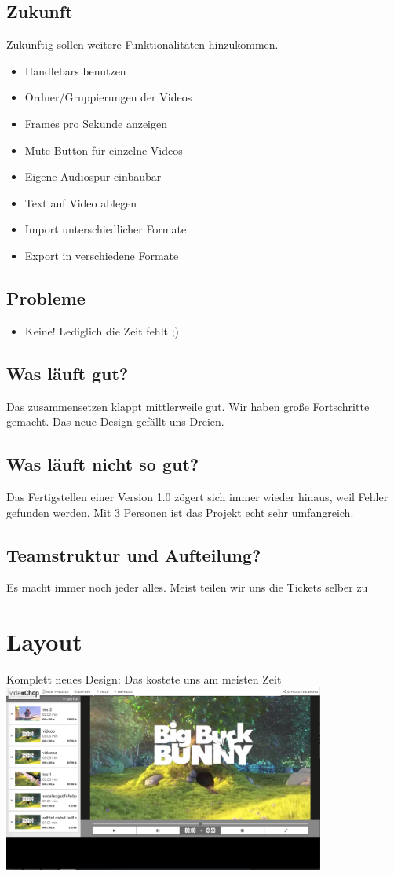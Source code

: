 \documentclass[a4paper,10pt]{scrartcl}
\begin{document}
\subsection{Zukunft}
Zukünftig sollen weitere Funktionalitäten hinzukommen. 
\begin{itemize}
    \item Handlebars benutzen
    \item Ordner/Gruppierungen der Videos
    \item Frames pro Sekunde anzeigen
    \item Mute-Button für einzelne Videos
    \item Eigene Audiospur einbaubar
    \item Text auf Video ablegen
    \item Import unterschiedlicher Formate
	\item Export in verschiedene Formate
	\end{itemize}
\subsection{Probleme}
\begin{itemize}
	\item Keine! Lediglich die Zeit fehlt ;)
	\end{itemize}
\subsection{Was läuft gut?}
Das zusammensetzen klappt mittlerweile gut. Wir haben große Fortschritte gemacht. Das neue Design gefällt uns Dreien.
\subsection{Was läuft nicht so gut?}
Das Fertigstellen einer Version 1.0 zögert sich immer wieder hinaus, weil Fehler gefunden werden. Mit 3 Personen ist das Projekt echt sehr umfangreich.
\subsection{Teamstruktur und Aufteilung?}
Es macht immer noch jeder alles. Meist teilen wir uns die Tickets selber zu
\section{Layout}
Komplett neues Design: Das kostete uns am meisten Zeit\\
\includegraphics[width=400px]{images/layout.png}\\
\newpage
\end{document}
